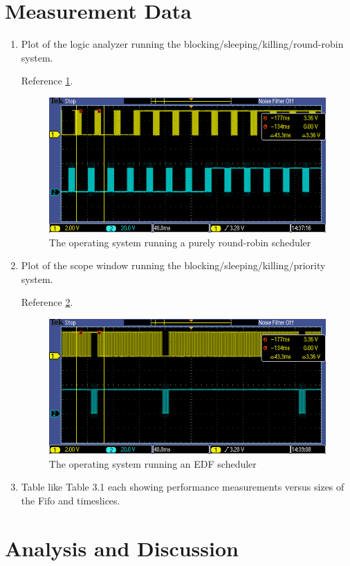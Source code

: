 \documentclass[12pt]{article}
\begin{document}
\section{Measurement Data}
\begin{enumerate}
\item Plot of the logic analyzer running the
  blocking/sleeping/killing/round-robin system.

  Reference \cref{fig:round-robin}.
  \begin{figure}
    \includegraphics{img/TEK00002}
    \caption{The operating system running a purely round-robin scheduler}
    \label{fig:round-robin}
  \end{figure}

\item Plot of the scope window running the
  blocking/sleeping/killing/priority system.

  Reference \cref{fig:edf}.
  \begin{figure}
    \includegraphics{img/TEK00003}
    \caption{The operating system running an EDF scheduler}
    \label{fig:edf}
  \end{figure}
\item Table like Table 3.1 each showing performance measurements
  versus sizes of the Fifo and timeslices.
\end{enumerate}
\section{Analysis and Discussion}
\end{document}
